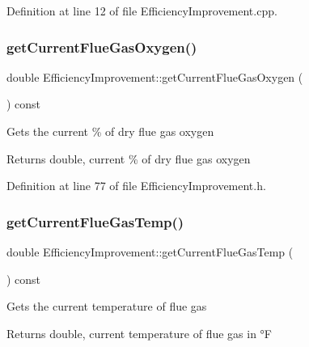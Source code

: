 Definition at line 12 of file Efficiency\+Improvement.\+cpp.

\mbox{\label{class_efficiency_improvement_a8b66a676d696f7a9fcc8fa987371d80b}} 
\subsubsection{\texorpdfstring{get\+Current\+Flue\+Gas\+Oxygen()}{getCurrentFlueGasOxygen()}}
{\footnotesize\ttfamily double Efficiency\+Improvement\+::get\+Current\+Flue\+Gas\+Oxygen (\begin{DoxyParamCaption}{ }\end{DoxyParamCaption}) const\hspace{0.3cm}{\ttfamily [inline]}}

Gets the current \% of dry flue gas oxygen

\begin{DoxyReturn}{Returns}
double, current \% of dry flue gas oxygen 
\end{DoxyReturn}


Definition at line 77 of file Efficiency\+Improvement.\+h.

\mbox{\label{class_efficiency_improvement_a27e97b5c7aad8aa6b4d02e18354d2292}} 
\subsubsection{\texorpdfstring{get\+Current\+Flue\+Gas\+Temp()}{getCurrentFlueGasTemp()}}
{\footnotesize\ttfamily double Efficiency\+Improvement\+::get\+Current\+Flue\+Gas\+Temp (\begin{DoxyParamCaption}{ }\end{DoxyParamCaption}) const\hspace{0.3cm}{\ttfamily [inline]}}

Gets the current temperature of flue gas

\begin{DoxyReturn}{Returns}
double, current temperature of flue gas in °F 
\end{DoxyReturn}


